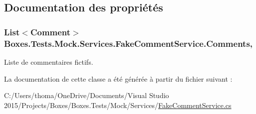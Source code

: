 \subsection{Documentation des propriétés}
\subsubsection[{\texorpdfstring{Comments}{Comments}}]{\setlength{\rightskip}{0pt plus 5cm}List$<$Comment$>$ Boxes.\+Tests.\+Mock.\+Services.\+Fake\+Comment\+Service.\+Comments\hspace{0.3cm}{\ttfamily [get]}, {}}\hypertarget{class_boxes_1_1_tests_1_1_mock_1_1_services_1_1_fake_comment_service_aad282113b2428dc23320b01ab86ab427}{}\label{class_boxes_1_1_tests_1_1_mock_1_1_services_1_1_fake_comment_service_aad282113b2428dc23320b01ab86ab427}


Liste de commentaires fictifs. 



La documentation de cette classe a été générée à partir du fichier suivant \+:\begin{DoxyCompactItemize}
\item 
C\+:/\+Users/thoma/\+One\+Drive/\+Documents/\+Visual Studio 2015/\+Projects/\+Boxes/\+Boxes.\+Tests/\+Mock/\+Services/\hyperlink{_fake_comment_service_8cs}{Fake\+Comment\+Service.\+cs}\end{DoxyCompactItemize}
